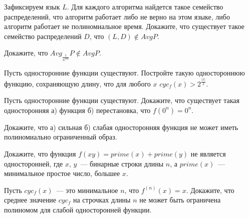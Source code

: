 \setcounter{curtask}{14}


\begin{task}
    Зафиксируем язык $L$. Для каждого алгоритма найдется такое семейство
    распределений, что алгоритм работает либо не верно на этом языке, либо алгоритм
    работает не полиномиальное время. Докажите, что существует такое семейство
    распределений $D$, что $(L, D) \notin AvgP$.
\end{task}

\begin{task}
    Докажите, что $Avg_{\frac{1}{n^{100}}}P \notin AvgP$.
\end{task}

\begin{task}
    Пусть односторонние функции существуют. Постройте такую одностороннюю функцию,
    сохраняющую длину, что для любого $x$ $cyc_{f}(x) > 2^{\frac{|x|}{2}}$.
\end{task}

\begin{task}
    Пусть односторонние функции существуют.
    Докажите, что существует такая односторонняя а) функция б) перестановка, что
    $f(0^n) = 0^n$.
\end{task}


\breakline

\begin{ptask}{3}
    Докажите, что а) сильная б) слабая односторонняя функция не может иметь
    полиномиально ограниченный образ.
\end{ptask}

\begin{ptask}{12}
    Докажите, что функция $f(xy) = prime(x) + prime(y)$ не является односторонней,
    где $x$, $y$~--- бинарные строки длины $n$, а $prime(x)$~--- минимальное простое
    число, большее $x$.
\end{ptask}

\begin{ptask}{13}
    Пусть $cyc_{f}(x)$~--- это минимальное $n$, что $f^{(n)}(x) = x$. Докажите, что
    среднее значение $cyc_{f}$ на строчках длины $n$ не может быть ограничена
    полиномом для слабой односторонней функции.
\end{ptask}

